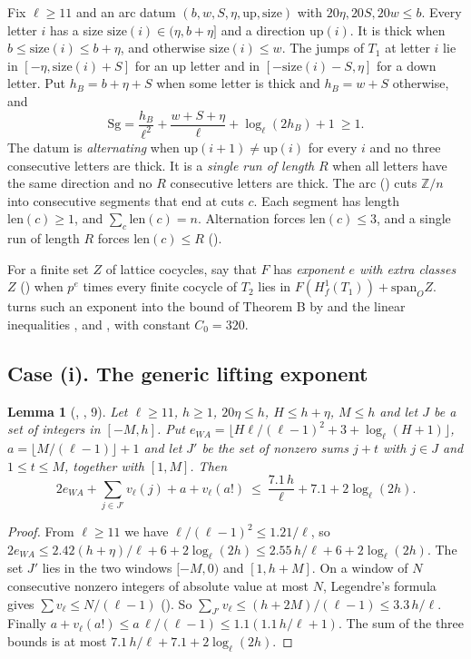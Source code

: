 \documentclass[11pt]{article}
\newcommand{\Sg}{\mathrm{Sg}}
\newtheorem{lemma}{Lemma}
\theoremstyle{definition}
\theoremstyle{remark}
\begin{document}
Fix $\ell\ge11$ and an arc datum $(b,w,S,\eta,\mathrm{up},\mathrm{size})$ with $20\eta,20S,20w\le b$. Every letter $i$ has a size $\mathrm{size}(i)\in(\eta,b+\eta]$ and a direction $\mathrm{up}(i)$. It is thick when $b\le\mathrm{size}(i)\le b+\eta$, and otherwise $\mathrm{size}(i)\le w$. The jumps of $T_1$ at letter $i$ lie in $[-\eta,\mathrm{size}(i)+S]$ for an up letter and in $[-\mathrm{size}(i)-S,\eta]$ for a down letter. Put $h_B=b+\eta+S$ when some letter is thick and $h_B=w+S$ otherwise, and
\[
\Sg=\frac{h_B}{\ell^2}+\frac{w+S+\eta}{\ell}+\log_\ell(2h_B)+1\ \ge1 .
\]
The datum is \emph{alternating} when $\mathrm{up}(i+1)\ne\mathrm{up}(i)$ for every $i$ and no three consecutive letters are thick. It is a \emph{single run of length} $R$ when all letters have the same direction and no $R$ consecutive letters are thick. The arc () cuts $\mathbb Z/n$ into consecutive segments that end at cuts $c$. Each segment has length $\mathrm{len}(c)\ge1$, and $\sum_c\mathrm{len}(c)=n$. Alternation forces $\mathrm{len}(c)\le3$, and a single run of length $R$ forces $\mathrm{len}(c)\le R$ ().

For a finite set $Z$ of lattice cocycles, say that $F$ has \emph{exponent $e$ with extra classes $Z$} () when $p^e$ times every finite cocycle of $T_2$ lies in $F(H^1_f(T_1))+\mathrm{span}_O Z$.  turns such an exponent into the bound of Theorem B by  and the linear inequalities ,  and , with constant $C_0=320$.

\subsection*{Case (i). The generic lifting exponent}

\begin{lemma}[, , 9]
Let $\ell\ge11$, $h\ge1$, $20\eta\le h$, $H\le h+\eta$, $M\le h$ and let $J$ be a set of integers in $[-M,h]$. Put $e_{WA}=\lfloor H\ell/(\ell-1)^2+3+\log_\ell(H+1)\rfloor$, $a=\lfloor M/(\ell-1)\rfloor+1$ and let $J'$ be the set of nonzero sums $j+t$ with $j\in J$ and $1\le t\le M$, together with $[1,M]$. Then
\[
2e_{WA}+\sum_{j\in J'}v_\ell(j)+a+v_\ell(a!)\ \le\ \frac{7.1\,h}{\ell}+7.1+2\log_\ell(2h).
\]
\end{lemma}

\begin{proof}
From $\ell\ge11$ we have $\ell/(\ell-1)^2\le1.21/\ell$, so $2e_{WA}\le2.42(h+\eta)/\ell+6+2\log_\ell(2h)\le2.55\,h/\ell+6+2\log_\ell(2h)$. The set $J'$ lies in the two windows $[-M,0)$ and $[1,h+M]$. On a window of $N$ consecutive nonzero integers of absolute value at most $N$, Legendre's formula gives $\sum v_\ell\le N/(\ell-1)$ (). So $\sum_{J'}v_\ell\le(h+2M)/(\ell-1)\le3.3\,h/\ell$. Finally $a+v_\ell(a!)\le a\,\ell/(\ell-1)\le1.1(1.1\,h/\ell+1)$. The sum of the three bounds is at most $7.1\,h/\ell+7.1+2\log_\ell(2h)$.
\end{proof}
\end{document}
